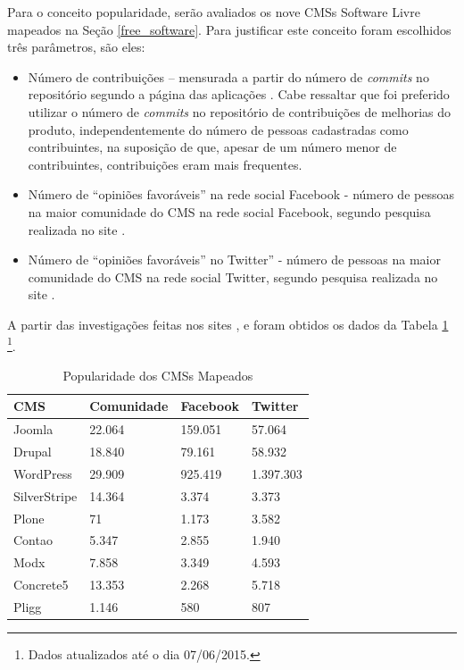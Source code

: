 Para o conceito popularidade, serão avaliados os nove CMSs Software Livre mapeados na Seção \ref{free_software}. Para justificar este conceito foram escolhidos três parâmetros, são eles:

\begin{itemize}
\item Número de contribuições – mensurada a partir do número de \textit{commits} no repositório segundo a página das aplicações  \cite{GitHub}. Cabe ressaltar que foi preferido utilizar o número de \textit{commits} no 
repositório de contribuições de melhorias do produto, independentemente do número de pessoas cadastradas como contribuintes, na suposição de que, apesar de um número menor de contribuintes,
contribuições eram mais frequentes.
\item Número de “opiniões favoráveis” na rede social Facebook - número de pessoas na maior comunidade do CMS na rede social Facebook, segundo pesquisa realizada no site \cite{face}.
\item Número de “opiniões favoráveis” no Twitter” - número de pessoas na maior comunidade do CMS na rede social Twitter, segundo pesquisa realizada no site \cite{twitter}.
\end{itemize}

A partir das investigações feitas nos sites \cite{face}, \cite{twitter} e \cite{GitHub} foram obtidos os dados da Tabela \ref{Popularidade} \footnote{Dados atualizados até o dia 07/06/2015.}.

\clearpage

\begin{table}[!ht]
\begin{center}
\caption{Popularidade dos CMSs Mapeados }
\label{Popularidade}
\begin{tabular}{|l|l|l|l|}\hline
\textbf{CMS} & \textbf{Comunidade} & \textbf{Facebook} & \textbf{Twitter} \\\hline
Joomla &  22.064 & 159.051 & 57.064\\\hline
Drupal & 18.840 & 79.161 & 58.932\\\hline
WordPress & 29.909 & 925.419 & 1.397.303\\\hline
SilverStripe & 14.364 & 3.374 & 3.373\\\hline
Plone & 71 & 1.173 & 3.582\\\hline
Contao & 5.347 & 2.855 & 1.940\\\hline
Modx & 7.858 & 3.349 & 4.593\\\hline
Concrete5 & 13.353 & 2.268 & 5.718\\\hline
Pligg & 1.146 & 580 & 807\\\hline
\end{tabular}
\end{center}
\end{table}

